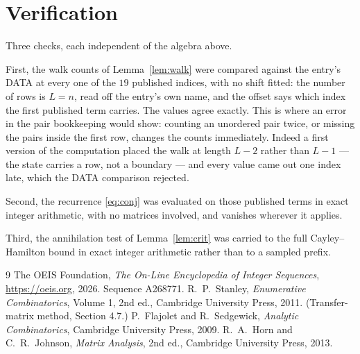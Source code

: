 \documentclass[11pt,a4paper]{article}
\theoremstyle{plain}
\theoremstyle{definition}
\begin{document}
\section{Verification}

Three checks, each independent of the algebra above.

First, the walk counts of Lemma~\ref{lem:walk} were compared against the entry's DATA at
every one of the $19$ published indices, with no shift fitted: the number of rows is
$L=n$, read off the entry's own name, and the offset says which index the first
published term carries. The values agree exactly. This is where an error in the pair
bookkeeping would show: counting an unordered pair twice, or missing the pairs inside the
first row, changes the counts immediately. Indeed a first version of the computation
placed the walk at length $L-2$ rather than $L-1$ --- the state carries a row, not a
boundary --- and every value came out one index late, which the DATA comparison rejected.

Second, the recurrence \eqref{eq:conj} was evaluated on those published terms in exact
integer arithmetic, with no matrices involved, and vanishes wherever it applies.

Third, the annihilation test of Lemma~\ref{lem:crit} was carried to the full
Cayley--Hamilton bound in exact integer arithmetic rather than to a sampled prefix.

\begin{thebibliography}{9}
 The OEIS Foundation, \emph{The On-Line Encyclopedia of Integer
Sequences}, \url{https://oeis.org}, 2026. Sequence A268771.
 R.~P.~Stanley, \emph{Enumerative Combinatorics}, Volume 1, 2nd ed.,
Cambridge University Press, 2011. (Transfer-matrix method, Section 4.7.)
 P.~Flajolet and R.~Sedgewick, \emph{Analytic Combinatorics}, Cambridge
University Press, 2009.
 R.~A.~Horn and C.~R.~Johnson, \emph{Matrix Analysis}, 2nd ed., Cambridge
University Press, 2013.
\end{thebibliography}
\end{document}
